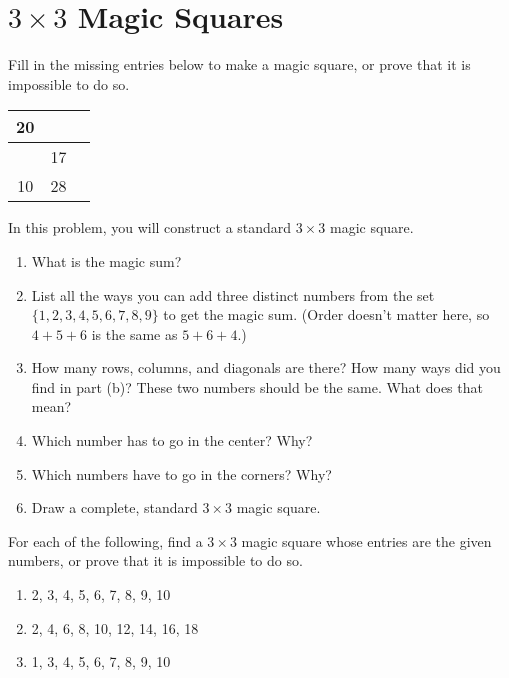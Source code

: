 \documentclass[11pt]{article}
\renewenvironment{problem}{\begin{problems}}{\end{problems}\vspace{5pt}}
\begin{document}
\section{$3 \times 3$ Magic Squares}

\begin{problem}[3 points]
Fill in the missing entries below to make a magic square, or prove that it is impossible to do so.
\begin{center}
\begin{tabular}{|c|c|c|}
\hline
20 & \phantom{00} & \phantom{00} \\ \hline
 & 17 & \\ \hline
 10 & 28 & \\ \hline
\end{tabular}
\end{center}
\end{problem}

\begin{problem}[15=1+3+2+3+3+3 points]
In this problem, you will construct a standard $3 \times 3$ magic square.
\begin{enumerate}[label=(\alph*)]
\item What is the magic sum?

\item List all the ways you can add three distinct numbers from the set $\{1, 2, 3, 4, 5, 6, 7, 8, 9\}$ to get the magic sum.
(Order doesn't matter here, so $4+5+6$ is the same as $5+6+4$.)

\item How many rows, columns, and diagonals are there? How many ways did you find in part (b)?
These two numbers should be the same. What does that mean?

\item Which number has to go in the center? Why?

\item Which numbers have to go in the corners? Why?

\item Draw a complete, standard $3 \times 3$ magic square.

\end{enumerate}
\end{problem}

\begin{problem}[12=4+4+4 points]
For each of the following, find a $3 \times 3$ magic square whose entries are the given numbers, or prove that it is impossible to do so.
\begin{enumerate}[label=(\alph*)]
\item 2, 3, 4, 5, 6, 7, 8, 9, 10

\item 2, 4, 6, 8, 10, 12, 14, 16, 18

\item 1, 3, 4, 5, 6, 7, 8, 9, 10
\end{enumerate}
\end{problem}
\end{document}

